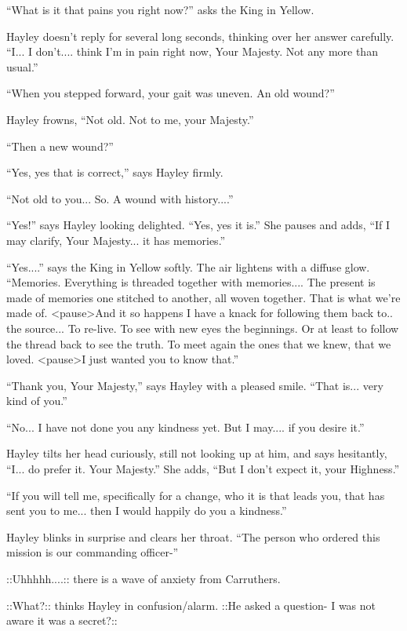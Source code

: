 ``What is it that pains you right now?'' asks the King in Yellow.

Hayley doesn't reply for several long seconds, thinking over her answer carefully.  ``I... I don't.... think I'm in pain right now, Your Majesty.  Not any more than usual.''

``When you stepped forward, your gait was uneven.  An old wound?''

Hayley frowns, ``Not old.  Not to me, your Majesty.''

``Then a new wound?''

``Yes, yes that is correct,'' says Hayley firmly.

``Not old to you... So.  A wound with history....''

``Yes!'' says Hayley looking delighted. ``Yes, yes it is.''  She pauses and adds, ``If I may clarify, Your Majesty... it has memories.''

``Yes....'' says the King in Yellow softly.  The air lightens with a diffuse glow.  ``Memories.  Everything is threaded together with memories....  The present is made of memories one stitched to another, all woven together.  That is what we're made of.  \textless pause\textgreater    And it so happens I have a knack for following them back to.. the source... To re-live.  To see with new eyes the beginnings.  Or at least to follow the thread back to see the truth.  To meet again the ones that we knew, that we loved. \textless pause\textgreater    I just wanted you to know that.''

``Thank you, Your Majesty,'' says Hayley with a pleased smile.  ``That is... very kind of you.''

``No... I have not done you any kindness yet.  But I may.... if you desire it.''

Hayley tilts her head curiously, still not looking up at him, and says hesitantly, ``I... do prefer it. Your Majesty.''  She adds, ``But I don't expect it, your Highness.''

``If you will tell me, specifically for a change, who it is that leads you, that has sent you to me... then I would happily do you a kindness.''

Hayley blinks in surprise and clears her throat. ``The person who ordered this mission is our commanding officer-''

 {\color[RGB]{153,0,255}::Uhhhhh....:: } there is a wave of anxiety from Carruthers.

 {\color[RGB]{255,153,0}::What?::}  thinks Hayley in confusion/alarm.   {\color[RGB]{255,153,0}::He asked a question- I was not aware it was a secret?::} 

